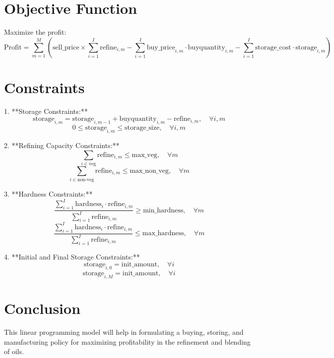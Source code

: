 \documentclass{article}
\begin{document}
\section*{Objective Function}
Maximize the profit:
\[
\text{Profit} = \sum_{m=1}^{M} \left( \text{sell\_price} \times \sum_{i=1}^{I} \text{refine}_{i,m} - \sum_{i=1}^{I} \text{buy\_price}_{i,m} \cdot \text{buyquantity}_{i,m} - \sum_{i=1}^{I} \text{storage\_cost} \cdot \text{storage}_{i,m} \right)
\]

\section*{Constraints}
1. **Storage Constraints:**
   \[
   \text{storage}_{i,m} = \text{storage}_{i,m-1} + \text{buyquantity}_{i,m} - \text{refine}_{i,m}, \quad \forall i, m
   \]
   \[
   0 \leq \text{storage}_{i,m} \leq \text{storage\_size}, \quad \forall i, m
   \]

2. **Refining Capacity Constraints:**
   \[
   \sum_{i \in \text{veg}} \text{refine}_{i,m} \leq \text{max\_veg}, \quad \forall m
   \]
   \[
   \sum_{i \in \text{non-veg}} \text{refine}_{i,m} \leq \text{max\_non\_veg}, \quad \forall m
   \]

3. **Hardness Constraints:**
   \[
   \frac{\sum_{i=1}^{I} \text{hardness}_{i} \cdot \text{refine}_{i,m}}{\sum_{i=1}^{I} \text{refine}_{i,m}} \geq \text{min\_hardness}, \quad \forall m
   \]
   \[
   \frac{\sum_{i=1}^{I} \text{hardness}_{i} \cdot \text{refine}_{i,m}}{\sum_{i=1}^{I} \text{refine}_{i,m}} \leq \text{max\_hardness}, \quad \forall m
   \]

4. **Initial and Final Storage Constraints:**
   \[
   \text{storage}_{i,0} = \text{init\_amount}, \quad \forall i
   \]
   \[
   \text{storage}_{i,M} = \text{init\_amount}, \quad \forall i
   \]

\section*{Conclusion}
This linear programming model will help in formulating a buying, storing, and manufacturing policy for maximizing profitability in the refinement and blending of oils.
\end{document}
